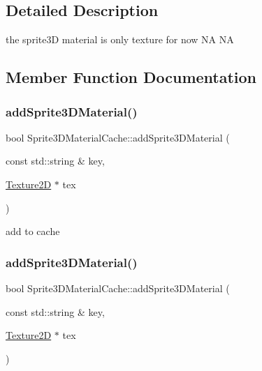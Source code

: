 \subsection{Detailed Description}
the sprite3D material is only texture for now  NA  NA 

\subsection{Member Function Documentation}
\mbox{\label{classSprite3DMaterialCache_a586f31f18ba69ebbd89663ce02dcb903}} 
\subsubsection{\texorpdfstring{add\+Sprite3\+D\+Material()}{addSprite3DMaterial()}\hspace{0.1cm}{\footnotesize\ttfamily [1/2]}}
{\footnotesize\ttfamily bool Sprite3\+D\+Material\+Cache\+::add\+Sprite3\+D\+Material (\begin{DoxyParamCaption}\item[{const std\+::string \&}]{key,  }\item[{\hyperlink{classTexture2D}{Texture2D} $\ast$}]{tex }\end{DoxyParamCaption})}

add to cache \mbox{\label{classSprite3DMaterialCache_a586f31f18ba69ebbd89663ce02dcb903}} 
\subsubsection{\texorpdfstring{add\+Sprite3\+D\+Material()}{addSprite3DMaterial()}\hspace{0.1cm}{\footnotesize\ttfamily [2/2]}}
{\footnotesize\ttfamily bool Sprite3\+D\+Material\+Cache\+::add\+Sprite3\+D\+Material (\begin{DoxyParamCaption}\item[{const std\+::string \&}]{key,  }\item[{\hyperlink{classTexture2D}{Texture2D} $\ast$}]{tex }\end{DoxyParamCaption})}

